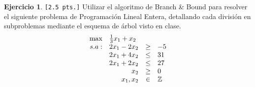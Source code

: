 \documentclass[a4paper,oneside,11pt]{amsart}
\theoremstyle{definition}
\newtheorem{quest}{Ejercicio}
\begin{document}
\begin{quest} \verb|[2.5 pts.]| Utilizar el algoritmo de Branch \& Bound para resolver el siguiente problema de Programación Lineal Entera, detallando cada división en subproblemas mediante el esquema de árbol visto en clase. 
\[
\begin{array}{rrcl}
\max & \multicolumn{3}{l}{\frac{1}{3}x_1+x_2} \\
s.a: & 2x_1-2x_2 & \geq & -5 \\
 & 2x_1+4x_2 & \leq & 31 \\
 & 2x_1+2x_2 & \leq & 27 \\
 & x_2 & \geq & 0 \\
 & x_1, x_2& \in & \mathbb{Z}\\
\end{array}
\]

\end{quest}

\end{document}
